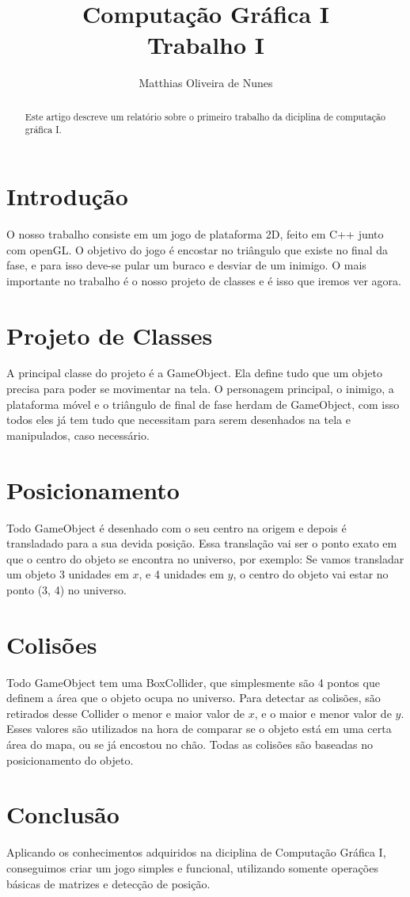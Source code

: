 \documentclass[12pt]{article}
\title{Computação Gráfica I\\ Trabalho I}
\author{Matthias Oliveira de Nunes}
\begin{document}
\maketitle

\begin{abstract}

Este artigo descreve um relatório sobre o primeiro trabalho da diciplina de
computação gráfica I.

\end{abstract}

\section{Introdução}

O nosso trabalho consiste em um jogo de plataforma 2D, feito em C++ junto com
openGL. O objetivo do jogo é encostar no triângulo que existe no final da fase,
e para isso deve-se pular um buraco e desviar de um inimigo. O mais importante
no trabalho é o nosso projeto de classes e é isso que iremos ver agora.

\section{Projeto de Classes}

A principal classe do projeto é a GameObject. Ela define tudo que um objeto
precisa para poder se movimentar na tela. O personagem principal, o inimigo, a
plataforma móvel e o triângulo de final de fase herdam de GameObject, com isso
todos eles já tem tudo que necessitam para serem desenhados na tela e
manipulados, caso necessário.

\section{Posicionamento}

Todo GameObject é desenhado com o seu centro na origem e depois é transladado
para a sua devida posição. Essa translação vai ser o ponto exato em que o centro
do objeto se encontra no universo, por exemplo: Se vamos transladar um objeto 3
unidades em $x$, e 4 unidades em $y$, o centro do objeto vai estar no ponto (3,
4) no universo.

\section{Colisões}

Todo GameObject tem uma BoxCollider, que simplesmente são 4 pontos que definem a
área que o objeto ocupa no universo. Para detectar as colisões, são retirados
desse Collider o menor e maior valor de $x$, e o maior e menor valor de $y$.
Esses valores são utilizados na hora de comparar se o objeto está em uma certa
área do mapa, ou se já encostou no chão. Todas as colisões são baseadas no
posicionamento do objeto.

\section{Conclusão}

Aplicando os conhecimentos adquiridos na diciplina de Computação Gráfica I,
conseguimos criar um jogo simples e funcional, utilizando somente operações
básicas de matrizes e detecção de posição.
\end{document}
